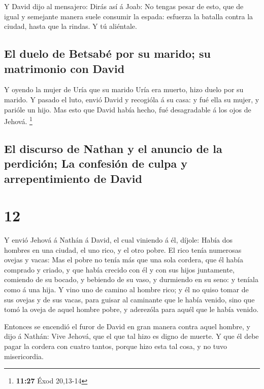  Y David dijo al mensajero: Dirás así á Joab: No tengas
pesar de esto, que de igual y semejante manera suele consumir la espada:
esfuerza la batalla contra la ciudad, hasta que la rindas. Y tú
aliéntale.

\hypertarget{el-duelo-de-betsabuxe9-por-su-marido-su-matrimonio-con-david}{%
\subsection{El duelo de Betsabé por su marido; su matrimonio con
David}\label{el-duelo-de-betsabuxe9-por-su-marido-su-matrimonio-con-david}}

 Y oyendo la mujer de Uría que su marido Uría era muerto,
hizo duelo por su marido.  Y pasado el luto, envió David
y recogióla á su casa: y fué ella su mujer, y parióle un hijo. Mas esto
que David había hecho, fué desagradable á los ojos de Jehová.
\footnote{\textbf{11:27} Éxod 20,13-14}

\hypertarget{el-discurso-de-nathan-y-el-anuncio-de-la-perdiciuxf3n-la-confesiuxf3n-de-culpa-y-arrepentimiento-de-david}{%
\subsection{El discurso de Nathan y el anuncio de la perdición; La
confesión de culpa y arrepentimiento de
David}\label{el-discurso-de-nathan-y-el-anuncio-de-la-perdiciuxf3n-la-confesiuxf3n-de-culpa-y-arrepentimiento-de-david}}

\hypertarget{section-11}{%
\section{12}\label{section-11}}

 Y envió Jehová á Nathán á David, el cual viniendo á él,
díjole: Había dos hombres en una ciudad, el uno rico, y el otro pobre.
 El rico tenía numerosas ovejas y vacas: 
Mas el pobre no tenía más que una sola cordera, que él había comprado y
criado, y que había crecido con él y con sus hijos juntamente, comiendo
de su bocado, y bebiendo de su vaso, y durmiendo en su seno: y teníala
como á una hija.  Y vino uno de camino al hombre rico; y
él no quiso tomar de sus ovejas y de sus vacas, para guisar al caminante
que le había venido, sino que tomó la oveja de aquel hombre pobre, y
aderezóla para aquél que le había venido.

 Entonces se encendió el furor de David en gran manera
contra aquel hombre, y dijo á Nathán: Vive Jehová, que el que tal hizo
es digno de muerte.  Y que él debe pagar la cordera con
cuatro tantos, porque hizo esta tal cosa, y no tuvo misericordia.

